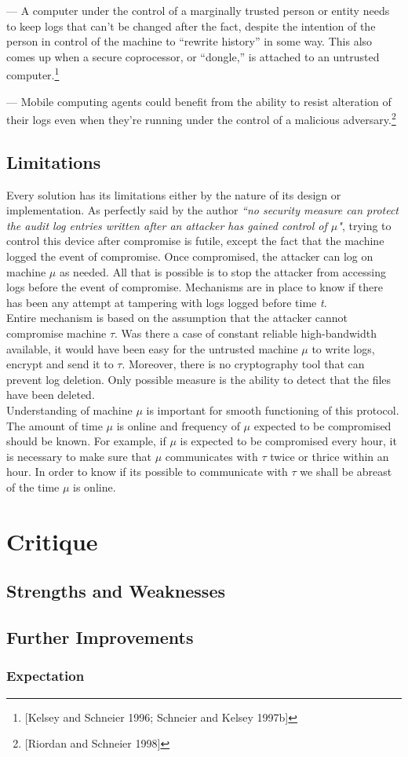 \documentclass[12pt, letter]{article}
\begin{document}
— A computer under the control of a marginally trusted person or entity needs to keep logs that can’t be changed after the fact, despite the intention of the person in control of the machine to “rewrite history” in some way. This also comes up when a secure coprocessor, or “dongle,” is attached to an untrusted computer.\footnote{[Kelsey and Schneier 1996; Schneier and Kelsey 1997b]}

— Mobile computing agents could benefit from the ability to resist alteration of their logs even when they’re running under the control of a malicious adversary.\footnote{[Riordan and Schneier 1998]}


\subsection{Limitations}

Every solution has its limitations either by the nature of its design or implementation. As perfectly said by the author \textit{``no security measure can protect the audit log entries written after an attacker has gained control of $\mu$"}, trying to control this device after compromise is futile, except the fact that the machine logged the event of compromise. Once compromised, the attacker can log on machine $\mu$ as needed. All that is possible is to stop the attacker from accessing logs before the event of compromise. Mechanisms are in place to know if there has been any attempt at tampering with logs logged before time \textit{t}.\\

Entire mechanism is based on the assumption that the attacker cannot compromise machine $\tau$. Was there a case of constant reliable high-bandwidth available, it would have been easy for the untrusted machine $\mu$ to write logs, encrypt and send it to $\tau$. Moreover, there is no cryptography tool that can prevent log deletion. Only possible measure is the ability to detect that the files have been deleted.\\

Understanding of machine $\mu$ is important for smooth functioning of this protocol. The amount of time $\mu$ is online and frequency of $\mu$ expected to be compromised should be known. For example, if $\mu$ is expected to be compromised every hour, it is necessary to make sure that $\mu$ communicates with $\tau$ twice or thrice within an hour. In order to know if its possible to communicate with $\tau$ we shall be abreast of the time $\mu$ is online.

\section{Critique}

\blindtext

\subsection{Strengths and Weaknesses}

\blindtext

\subsection{Further Improvements}

\blindtext

\subsubsection{Expectation}
\end{document}
